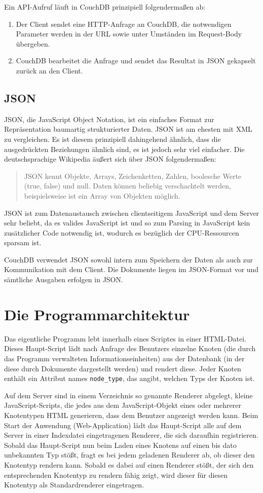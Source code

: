 \documentclass[12pt,ngerman,a4]{scrartcl}
\newcommand{\pquote}[1]{\glqq #1\grqq}
\newcommand{\code}[1]{\texttt{#1}}
\begin{document}
Ein API-Aufruf läuft in CouchDB prinzipiell folgendermaßen ab:
\begin{enumerate}
\item Der Client sendet eine HTTP-Anfrage an CouchDB, die notwendigen Parameter werden in der URL sowie unter Umständen im Request-Body übergeben.
\item CouchDB bearbeitet die Anfrage und sendet das Resultat in JSON gekapselt zurück an den Client.
\end{enumerate}
\subsection{JSON}
JSON, die JavaScript Object Notation, ist ein einfaches Format zur Repräsentation baumartig strukturierter Daten. JSON ist am ehesten mit XML zu vergleichen. Es ist diesem prinzipiell dahingehend ähnlich, dass die ausgedrückten Beziehungen ähnlich sind, es ist jedoch sehr viel einfacher. Die deutschsprachige Wikipedia äußert sich über JSON folgendermaßen:
\begin{quote}
JSON kennt Objekte, Arrays, Zeichenketten, Zahlen, boolesche Werte (true, false) und null. Daten können beliebig verschachtelt werden, beispielsweise ist ein Array von Objekten möglich.\cite{wpjson}
\end{quote}
JSON ist zum Datenaustausch zwischen clientseitigem JavaScript und dem Server sehr beliebt, da es valides JavaScript ist und so zum Parsing in JavaScript kein zusätzlicher Code notwendig ist, wodurch es bezüglich der CPU-Ressourcen sparsam ist.

CouchDB verwendet JSON sowohl intern zum Speichern der Daten als auch zur Kommunikation mit dem Client. Die Dokumente liegen im JSON-Format vor und sämtliche Ausgaben erfolgen in JSON.

\section{Die Programmarchitektur}
Das eigentliche Programm lebt innerhalb eines Scriptes in einer HTML-Datei. 
Dieses \pquote{Haupt-Script} lädt nach Anfrage des Benutzers einzelne Knoten (die durch das Programm verwalteten Informationseinheiten) aus der Datenbank (in der diese durch Dokumente dargestellt werden) und rendert diese. Jeder Knoten enthält ein Attribut names \code{node\_type}, das angibt, welchen Typs der Knoten ist.

Auf dem Server sind in einem Verzeichnis so genannte Renderer abgelegt, kleine JavaScript-Scripts, die jedes aus dem JavaScript-Objekt eines oder mehrerer Knotentypen HTML generieren, dass dem Benutzer angezeigt werden kann. Beim Start der Anwendung (Web-Application) lädt das Haupt-Script alle auf dem Server in einer Indexdatei eingetragenen Renderer, die sich daraufhin registrieren. Sobald das Haupt-Script nun beim Laden eines Knotens auf einen bis dato unbekannten Typ stößt, fragt es bei jedem geladenen Renderer ab, ob dieser den Knotentyp rendern kann. Sobald es dabei auf einen Renderer stößt, der sich den entsprechenden Knotentyp zu rendern fähig zeigt, wird dieser für diesen Knotentyp als Standardrenderer eingetragen.
\end{document}
